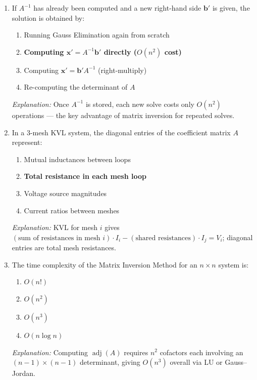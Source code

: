 \documentclass[12pt,a4paper]{article}
\begin{document}
\begin{enumerate}[noitemsep, label=\textbf{MCQ\arabic*.}]
  \item If $A^{-1}$ has already been computed and a new right-hand side $\mathbf{b}'$ is given, the solution is obtained by:
  \begin{enumerate}[noitemsep, label=(\alph*)]
    \item Running Gauss Elimination again from scratch
    \item \textbf{Computing $\mathbf{x}' = A^{-1}\mathbf{b}'$ directly ($O(n^2)$ cost)}
    \item Computing $\mathbf{x}' = \mathbf{b}' A^{-1}$ (right-multiply)
    \item Re-computing the determinant of $A$
  \end{enumerate}
  \textit{Explanation:} Once $A^{-1}$ is stored, each new solve costs only $O(n^2)$ operations --- the key advantage of matrix inversion for repeated solves.

  \item In a 3-mesh KVL system, the diagonal entries of the coefficient matrix $A$ represent:
  \begin{enumerate}[noitemsep, label=(\alph*)]
    \item Mutual inductances between loops
    \item \textbf{Total resistance in each mesh loop}
    \item Voltage source magnitudes
    \item Current ratios between meshes
  \end{enumerate}
  \textit{Explanation:} KVL for mesh $i$ gives $(\text{sum of resistances in mesh } i)\cdot I_i - (\text{shared resistances})\cdot I_j = V_i$; diagonal entries are total mesh resistances.

  \item The time complexity of the Matrix Inversion Method for an $n\times n$ system is:
  \begin{enumerate}[noitemsep, label=(\alph*)]
    \item $O(n!)$
    \item $O(n^2)$
    \item \textbf{$O(n^3)$}
    \item $O(n \log n)$
  \end{enumerate}
  \textit{Explanation:} Computing $\operatorname{adj}(A)$ requires $n^2$ cofactors each involving an $(n-1)\times(n-1)$ determinant, giving $O(n^3)$ overall via LU or Gauss--Jordan.

\end{enumerate}
\end{document}
